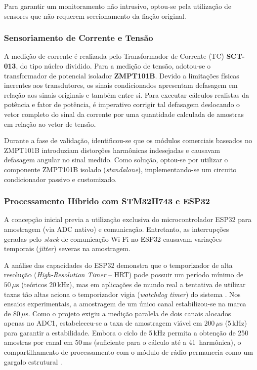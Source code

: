 \documentclass[12pt]{article}
\begin{document}
Para garantir um monitoramento n\~ao intrusivo, optou-se pela utiliza\c{c}\~ao de
sensores que n\~ao requerem seccionamento da fia\c{c}\~ao original.

\subsubsection{Sensoriamento de Corrente e Tens\~ao}

A medi\c{c}\~ao de corrente \'e realizada pelo Transformador de Corrente (TC)
\textbf{SCT-013}, do tipo n\'ucleo dividido. Para a medi\c{c}\~ao de tens\~ao,
adotou-se o transformador de potencial isolador \textbf{ZMPT101B}. Devido a
limita\c{c}\~oes f\'isicas inerentes aos transdutores, os sinais condicionados
apresentam defasagem em rela\c{c}\~ao aos sinais originais e tamb\'em entre si.
Para executar c\'alculos realistas da pot\^encia e fator de pot\^encia, \'e imperativo
corrigir tal defasagem deslocando o vetor completo do sinal da corrente por uma
quantidade calculada de amostras em rela\c{c}\~ao ao vetor de tens\~ao.

Durante a fase de valida\c{c}\~ao, identificou-se que os m\'odulos comerciais
baseados no ZMPT101B introduziam distor\c{c}\~oes harm\^onicas indesejadas e
causavam defasagem angular no sinal medido. Como solu\c{c}\~ao, optou-se por
utilizar o componente ZMPT101B isolado (\textit{standalone}), implementando-se um
circuito condicionador passivo e customizado.

\subsubsection{Processamento H\'ibrido com STM32H743 e ESP32}

A concep\c{c}\~ao inicial previa a utiliza\c{c}\~ao exclusiva do microcontrolador
ESP32 para amostragem (via ADC nativo) e comunica\c{c}\~ao. Entretanto, as
interrup\c{c}\~oes geradas pelo \textit{stack} de comunica\c{c}\~ao Wi-Fi no ESP32
causavam varia\c{c}\~oes temporais (\textit{jitter}) severas na amostragem.

A an\'alise das capacidades do ESP32 demonstra que o temporizador de alta
resolu\c{c}\~ao (\textit{High-Resolution Timer} -- HRT) pode possuir um per\'iodo
m\'inimo de $50\,\mu\text{s}$ (te\'oricos 20\,kHz), mas em aplica\c{c}\~oes de mundo
real a tentativa de utilizar taxas t\~ao altas aciona o temporizador vigia
(\textit{watchdog timer}) do sistema \citep{ref8}. Nos ensaios experimentais, a
amostragem de um \'unico canal estabilizou-se na marca de $80\,\mu\text{s}$. Como o
projeto exigiu a medi\c{c}\~ao paralela de dois canais alocados apenas no ADC1,
estabeleceu-se a taxa de amostragem vi\'avel em $200\,\mu\text{s}$ (5\,kHz) para
garantir a estabilidade. Embora o ciclo de 5\,kHz permita a obten\c{c}\~ao de 250
amostras por canal em 50\,ms (suficiente para o c\'alculo at\'e a 41\textordfeminine~harm\^onica),
o compartilhamento de processamento com o m\'odulo de r\'adio permanecia como um
gargalo estrutural \citep{ref8}.
\end{document}
